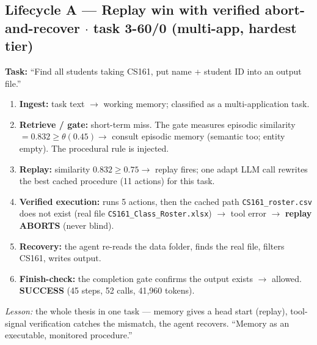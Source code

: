 \documentclass[11pt]{article}
\newcommand{\code}[1]{\texttt{#1}}
\newcommand{\cmark}{\textcolor{green!55!black}{\ding{51}}}
\begin{document}
\subsection*{Lifecycle A --- Replay win with verified abort-and-recover $\cdot$ task 3-60/0 (multi-app, hardest tier) \cmark}
\textbf{Task:} ``Find all students taking CS161, put name + student ID into an output file.''
\begin{enumerate}[leftmargin=1.5em,itemsep=1pt]
\item \textbf{Ingest:} task text $\to$ working memory; classified as a multi-application task.
\item \textbf{Retrieve / gate:} short-term miss. The gate measures episodic similarity $= 0.832 \ge
\theta(0.45) \to$ consult episodic memory (semantic too; entity empty). The procedural rule is injected.
\item \textbf{Replay:} similarity $0.832 \ge 0.75 \to$ replay fires; one adapt LLM call rewrites the best
cached procedure (11 actions) for this task.
\item \textbf{Verified execution:} runs 5 actions, then the cached path \code{CS161\_roster.csv} does not
exist (real file \code{CS161\_Class\_Roster.xlsx}) $\to$ tool error $\to$ \textbf{replay ABORTS} (never blind).
\item \textbf{Recovery:} the agent re-reads the data folder, finds the real file, filters CS161, writes output.
\item \textbf{Finish-check:} the completion gate confirms the output exists $\to$ allowed. \textbf{SUCCESS}
(45 steps, 52 calls, 41{,}960 tokens).
\end{enumerate}
\emph{Lesson:} the whole thesis in one task --- memory gives a head start (replay), tool-signal
verification catches the mismatch, the agent recovers. ``Memory as an executable, monitored procedure.''
\end{document}
